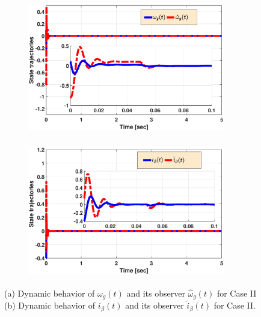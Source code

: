 \documentclass[preprint,11pt]{elsarticle}
\begin{document}
\begin{figure}[h]
    \begin{subfigure}[b]{0.5\textwidth}
    \centerline{\includegraphics[width=8.6cm,height=5.8cm]{xx1.eps}}
    \caption{ }
    \end{subfigure}
    \begin{subfigure}[b]{0.5\textwidth}
    \centerline{\includegraphics[width=8.6cm,height=5.8cm]{xx2.eps}}
    \caption{ }
    \end{subfigure}
    \caption{(a) Dynamic behavior of $\omega_g(t)$ and its observer $\hat{\omega}_g(t)$ for Case II  (b) Dynamic behavior of $i_\beta(t)$ and its observer $\hat{i}_\beta(t)$ for Case II.} \label{F3}
    \vspace{-0.3cm}
    \end{figure}
\end{document}
